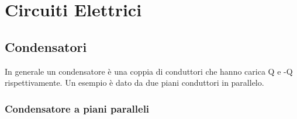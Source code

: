 \setcounter{chapter}{2}
\chapter{Circuiti Elettrici}

\section{Condensatori}

In generale un condensatore \`e una coppia di conduttori che hanno carica Q e -Q rispettivamente. Un  esempio \`e dato da due piani conduttori in parallelo.

\subsection{Condensatore a piani paralleli}

